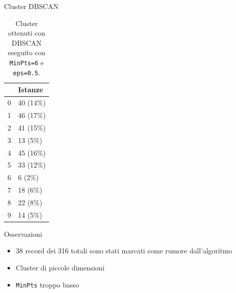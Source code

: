 \documentclass{beamer}
\begin{document}
\begin{frame}{Cluster DBSCAN}
  \begin{table}[H]
    \centering
    \begin{tabular}{@{}ll@{}}
    \toprule
                            & Istanze  \\\midrule
    \multicolumn{1}{l}{0} & 40 (14\%)  \\
    \multicolumn{1}{l}{1} & 46 (17\%)  \\
    \multicolumn{1}{l}{2} & 41 (15\%)  \\
    \multicolumn{1}{l}{3} & 13 (5\%)   \\
    \multicolumn{1}{l}{4} & 45 (16\%)  \\
    \multicolumn{1}{l}{5} & 33 (12\%)  \\
    \multicolumn{1}{l}{6} & 6  (2\%)   \\
    \multicolumn{1}{l}{7} & 18 (6\%)   \\
    \multicolumn{1}{l}{8} & 22 (8\%)   \\
    \multicolumn{1}{l}{9} & 14 (5\%)   \\\bottomrule
    \end{tabular}
    \caption{Cluster ottenuti con DBSCAN eseguito con \texttt{MinPts=6} e \texttt{eps=0.5}.}
    \end{table}
\end{frame}


\begin{frame}{Osservazioni}
  \begin{itemize}
    \item 38 record dei 316 totali sono stati marcati come rumore dall’algoritmo
    \item Cluster di piccole dimensioni
    \item \texttt{MinPts} troppo basso
  \end{itemize}
\end{frame}
\end{document}
